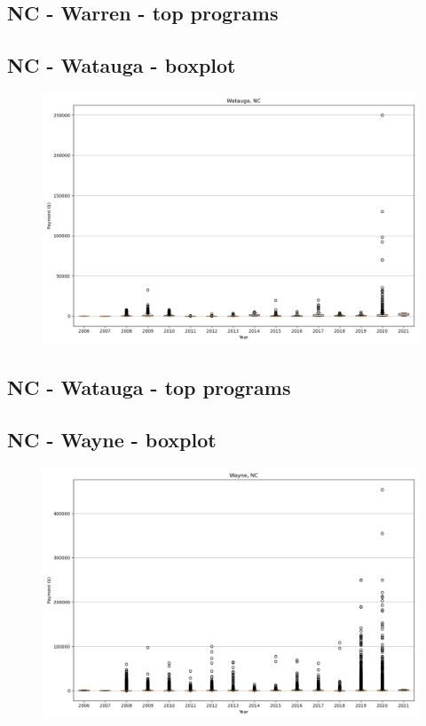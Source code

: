 \subsection*{NC - Warren - top programs}

\newpage
\subsection*{NC - Watauga - boxplot}
\begin{figure}[h]
\centering
\includegraphics[width=7in]{../output/boxplots/counties/Watauga-NC_boxplot.png}
\end{figure}


\subsection*{NC - Watauga - top programs}

\newpage
\subsection*{NC - Wayne - boxplot}
\begin{figure}[h]
\centering
\includegraphics[width=7in]{../output/boxplots/counties/Wayne-NC_boxplot.png}
\end{figure}



